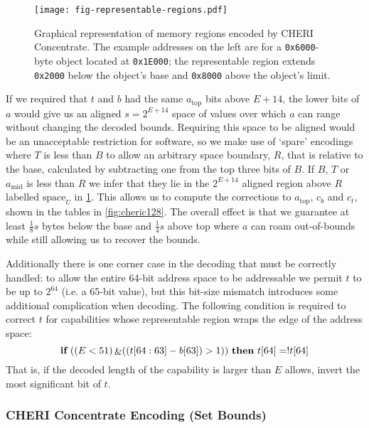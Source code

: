 \begin{figure}[tb]\footnotesize
\centering
\texttt{[image: fig-representable-regions.pdf]}
\caption{Graphical representation of memory regions encoded by CHERI Concentrate.  The example
addresses on the left are for a \texttt{0x6000}-byte object located at \texttt{0x1E000};
the representable region extends \texttt{0x2000} below the object's base and \texttt{0x8000}
above the object's limit.}
\label{fig:ccregions}
\end{figure}

If we required that $t$ and $b$ had the same $a_\text{top}$ bits above $E + 14$, the lower bits of $a$ would give us an aligned $s = 2^{E+14}$ space of values over which $a$ can range without changing the decoded bounds.
Requiring this space to be aligned would be an unacceptable restriction for software, so we make use of `spare' encodings where $T$ is less than $B$ to allow an arbitrary space boundary, $R$, that is relative to the base, calculated by subtracting one from the top three bits of $B$.
If $B$, $T$ or $a_\text{mid}$ is less than $R$ we infer that they lie in the $2^{E+14}$ aligned region above $R$ labelled $\text{space}_U$ in \cref{fig:ccregions}.
This allows us to compute the corrections to $a_\text{top}$, $c_b$ and $c_t$, shown in the tables in \cref{fig:cheric128}.
The overall effect is that we guarantee at least $ \frac{1}{8} s$ bytes below the base and $ \frac{1}{4} s $ above top where $a$ can roam out-of-bounds while still allowing us to recover the bounds.

Additionally there is one corner case in the decoding that must be correctly handled:
to allow the entire 64-bit address space to be addressable we permit $t$ to be up to $2^{64}$ (i.e. a 65-bit value), but this bit-size mismatch introduces some additional complication when decoding.
The following condition is required to correct $t$ for capabilities whose representable region wraps the edge of the address space:
\[ \algorithmicif\ ((E<51) \mathop{\&} ((t[64:63]-b[63]) > 1))\ \algorithmicthen\ t[64] = !t[64]\]
That is, if the decoded length of the capability is larger than $E$ allows, invert the most significant bit of $t$.

\subsubsection{CHERI Concentrate Encoding (Set Bounds)}
\label{sec:cheri-concentrate-encoding-set-bounds}

